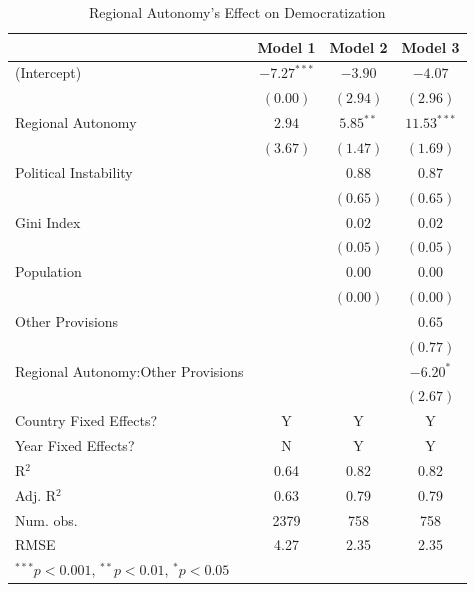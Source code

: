 \documentclass[12pt]{article}
\begin{document}
\begin{table}[!htbp]
	\begin{center}
		\begin{tabular}{l c c c }
			\hline
			& Model 1 & Model 2 & Model 3 \\
			\hline
			(Intercept)                  & $-7.27^{***}$ & $-3.90$     & $-4.07$       \\
			& $(0.00)$      & $(2.94)$    & $(2.96)$      \\
			Regional Autonomy                   & $2.94$        & $5.85^{**}$ & $11.53^{***}$ \\
			& $(3.67)$      & $(1.47)$    & $(1.69)$      \\
			Political Instability               &               & $0.88$      & $0.87$        \\
			&               & $(0.65)$    & $(0.65)$      \\
			Gini Index               &               & $0.02$      & $0.02$        \\
			&               & $(0.05)$    & $(0.05)$      \\
			Population               &               & $0.00$      & $0.00$        \\
			&               & $(0.00)$    & $(0.00)$      \\
			Other Provisions            &               &             & $0.65$        \\
			&               &             & $(0.77)$      \\
			Regional Autonomy:Other Provisions &               &             & $-6.20^{*}$   \\
			&               &             & $(2.67)$      \\
			\hline
			Country Fixed Effects?		 & Y			 & Y 		   & Y			  \\
			Year Fixed Effects?			 & N			 & Y		   & Y			  \\
			R$^2$                        & 0.64          & 0.82        & 0.82          \\
			Adj. R$^2$                   & 0.63          & 0.79        & 0.79          \\
			Num. obs.                    & 2379          & 758         & 758           \\
			RMSE                         & 4.27          & 2.35        & 2.35          \\
			\hline
			\multicolumn{4}{l}{\scriptsize{$^{***}p<0.001$, $^{**}p<0.01$, $^*p<0.05$}}
		\end{tabular}
		\caption{Regional Autonomy's Effect on Democratization}
		\label{table:coefficients}
	\end{center}
\end{table}
\end{document}
